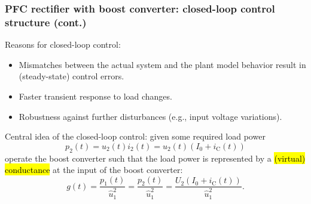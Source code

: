 \begin{frame}
    \frametitle{PFC rectifier with boost converter: closed-loop control structure (cont.)}
    Reasons for closed-loop control:
    \begin{itemize}
        \item Mismatches between the actual system and the plant model behavior result in (steady-state) control errors.\pause
        \item Faster transient response to load changes.\pause
        \item Robustness against further disturbances (e.g., input voltage variations).
    \end{itemize}\pause
    Central idea of the closed-loop control: given some required load power 
    $$
    p_2(t) = u_2(t)i_2(t) = u_2(t)\left(I_0 + i_\mathrm{C}(t)\right) 
    $$\pause
    operate the boost converter such that the load power is represented by a \hl{(virtual) conductance} at the input of the boost converter:
    $$
    g(t) = \frac{p_1(t)}{\hat{u}_1^2} = \frac{p_2(t)}{\hat{u}_1^2} = \frac{U_2\left(I_0 + i_\mathrm{C}(t)\right)}{\hat{u}_1^2}.
    $$ 
\end{frame}

